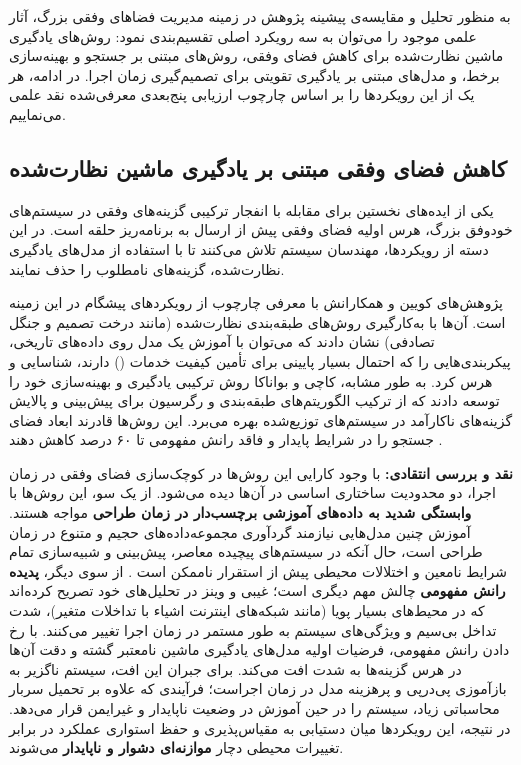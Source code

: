 \documentclass[oneside,openany,phd]{TMU-Thesis}
\begin{document}
به منظور تحلیل و مقایسه‌ی پیشینه پژوهش در زمینه مدیریت فضاهای وفقی بزرگ، آثار علمی موجود را می‌توان به سه رویکرد اصلی تقسیم‌بندی نمود: روش‌های یادگیری ماشین نظارت‌شده برای کاهش فضای وفقی، روش‌های مبتنی بر جستجو و بهینه‌سازی برخط، و مدل‌های مبتنی بر یادگیری تقویتی برای تصمیم‌گیری زمان اجرا. در ادامه، هر یک از این رویکردها را بر اساس چارچوب ارزیابی پنج‌بعدی معرفی‌شده نقد علمی می‌نماییم.

\subsection{کاهش فضای وفقی مبتنی بر یادگیری ماشین نظارت‌شده}
\label{sec:ch3_ml_pruning}

یکی از ایده‌های نخستین برای مقابله با انفجار ترکیبی گزینه‌های وفقی در سیستم‌های خودوفق بزرگ، هرس اولیه فضای وفقی پیش از ارسال به برنامه‌ریز حلقه  است. در این دسته از رویکردها، مهندسان سیستم تلاش می‌کنند تا با استفاده از مدل‌های یادگیری نظارت‌شده، گزینه‌های نامطلوب را حذف نمایند.

پژوهش‌های کویین و همکارانش \cite{quin2019efficient, quin2022reducing} با معرفی چارچوب  از رویکردهای پیشگام در این زمینه است. آن‌ها با به‌کارگیری روش‌های طبقه‌بندی نظارت‌شده (مانند درخت تصمیم و جنگل تصادفی) نشان دادند که می‌توان با آموزش یک مدل روی داده‌های تاریخی، پیکربندی‌هایی را که احتمال بسیار پایینی برای تأمین کیفیت خدمات () دارند، شناسایی و هرس کرد. به طور مشابه، کاچی و بواناکا \cite{kachi2023hybrid} روش ترکیبی یادگیری و بهینه‌سازی خود را توسعه دادند که از ترکیب الگوریتم‌های طبقه‌بندی و رگرسیون برای پیش‌بینی و پالایش گزینه‌های ناکارآمد در سیستم‌های توزیع‌شده بهره می‌برد. این روش‌ها قادرند ابعاد فضای جستجو را در شرایط پایدار و فاقد رانش مفهومی تا ۶۰ درصد کاهش دهند \cite{kachi2023hybrid}.

\textbf{نقد و بررسی انتقادی:}
با وجود کارایی این روش‌ها در کوچک‌سازی فضای وفقی در زمان اجرا، دو محدودیت ساختاری اساسی در آن‌ها دیده می‌شود.
از یک سو، این روش‌ها با \textbf{وابستگی شدید به داده‌های آموزشی برچسب‌دار در زمان طراحی} مواجه هستند. آموزش چنین مدل‌هایی نیازمند گردآوری مجموعه‌داده‌های حجیم و متنوع در زمان طراحی است، حال آنکه در سیستم‌های پیچیده معاصر، پیش‌بینی و شبیه‌سازی تمام شرایط نامعین و اختلالات محیطی پیش از استقرار ناممکن است \cite{quin2022reducing, gheibi2024dealing}.
از سوی دیگر، \textbf{پدیده رانش مفهومی} چالش مهم دیگری است؛ غیبی و وینز \cite{gheibi2024dealing} در تحلیل‌های خود تصریح کرده‌اند که در محیط‌های بسیار پویا (مانند شبکه‌های اینترنت اشیاء با تداخلات متغیر)، شدت تداخل بی‌سیم و ویژگی‌های سیستم به طور مستمر در زمان اجرا تغییر می‌کنند. با رخ دادن رانش مفهومی، فرضیات اولیه مدل‌های یادگیری ماشین نامعتبر گشته و دقت آن‌ها در هرس گزینه‌ها به شدت افت می‌کند. برای جبران این افت، سیستم ناگزیر به بازآموزی پی‌درپی و پرهزینه مدل در زمان اجراست؛ فرآیندی که علاوه بر تحمیل سربار محاسباتی زیاد، سیستم را در حین آموزش در وضعیت ناپایدار و غیرایمن قرار می‌دهد. در نتیجه، این رویکردها میان دستیابی به مقیاس‌پذیری و حفظ استواری عملکرد در برابر تغییرات محیطی دچار \textbf{موازنه‌ای دشوار و ناپایدار} می‌شوند.
\end{document}
